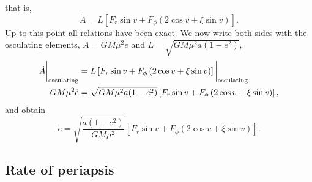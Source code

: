 	that is,
	\begin{equation}
		\boxed{
			\dot A
			=
			L
			\left[
			F_r\sin v
			+
			F_{\phi}
			\left(
			2\cos v+\xi\sin v
			\right)
			\right].
		}
		\label{eq:Adot_magnitude_exact}
	\end{equation}
	Up to this point all relations have been exact. We now write both sides with the osculating elements, $A=GM\mu^2e$ and $L=\sqrt{GM\mu^2a(1-e^2)}$,
	\begin{align}
		\dot A\bigg\lvert_{\rm osculating}
		&=
		L
		\left[
		F_r\sin v
		+
		F_{\phi}
		\left(
		2\cos v+\xi\sin v
		\right)
		\right]\bigg\lvert_{\rm osculating} \nonumber\\
		GM\mu^2\dot e &=\sqrt{GM\mu^2 a(1-e^2)}\left[
		F_r\sin v
		+
		F_{\phi}
		\left(
		2\cos v+\xi\sin v
		\right)
		\right],
	\end{align}
	and obtain
	\begin{equation}
		\boxed{
			\dot e
			=
			\sqrt{
				\frac{a(1-e^2)}{GM\mu^2}
			}
			\left[
			F_r\sin v
			+
			F_{\phi}
			\left(
			2\cos v+\xi\sin v
			\right)
			\right].
		}
		\label{eq:gauss_edot}
	\end{equation}
	
	
	\subsection{Rate of periapsis}
	
